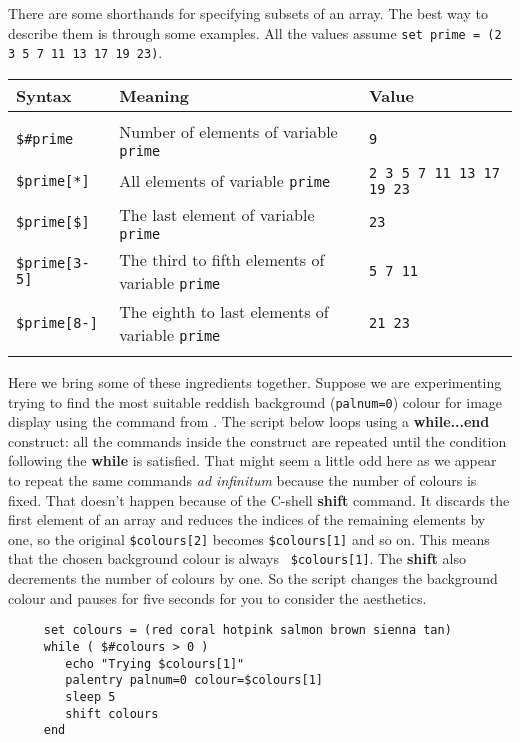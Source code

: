 \medskip
There are some shorthands for specifying subsets of an array.  The best
way to describe them is through some examples.  
All the values assume {\tt set prime = (2 3 5 7 11 13 17 19 23)}.

\begin{center}
\begin{tabular}{lp{80mm}l}
Syntax            & Meaning                    & Value \\ \hline
\\
{\tt \$\#prime}   & Number of elements of variable {\tt prime} & {\tt 9} \\
{\tt \$prime[*]}  & All elements of variable {\tt prime} & {\tt 2 3 5 7 11 13
                                                           17 19 23} \\
{\tt \$prime[\$]} & The last element of variable {\tt prime} & {\tt 23} \\
{\tt \$prime[3-5]} & The third to fifth elements of variable {\tt prime} &
                                                           {\tt 5 7 11} \\
{\tt \$prime[8-]} & The eighth to last elements of variable {\tt prime} &
                                                           {\tt 21 23} \\
\\ \hline
\end{tabular}
\end{center}
\bigskip

Here we bring some of these ingredients together.  Suppose we are
experimenting trying to find the most suitable reddish background
({\tt{palnum=0}}) colour for image display using the 
 command
from \KAPPAref\@.  The script below loops using a {\bf while...end}
construct: all the commands inside the construct are repeated until the
condition following the {\bf while} is satisfied.  That might seem a
little odd here as we appear to repeat the same commands {\em ad
infinitum} because the number of colours is fixed.  That doesn't happen
because of the C-shell {\bf shift} command.  It discards the first
element of an array and reduces the indices of the remaining elements by
one, so the original {\tt \$colours[2]} becomes {\tt \$colours[1]} and
so on.  This means that the chosen background colour is always {\tt
\$colours[1]}.  The {\bf shift} also decrements the number of colours by
one.  So the script changes the background colour and pauses for five
seconds for you to consider the aesthetics.

\small
\begin{verbatim}
     set colours = (red coral hotpink salmon brown sienna tan)
     while ( $#colours > 0 )
        echo "Trying $colours[1]"
        palentry palnum=0 colour=$colours[1]
        sleep 5
        shift colours
     end
\end{verbatim}
\normalsize


